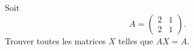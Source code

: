 \begin{exercice}\label{exoLineraire0008}

Soit
\begin{equation}
	A=\begin{pmatrix}
	2	&	1	\\ 
	2	&	1	
\end{pmatrix}.
\end{equation}
Trouver toutes les matrices $X$ telles que $AX=A$.

\end{exercice}
